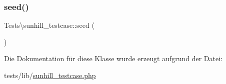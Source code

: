 \subsubsection{\texorpdfstring{seed()}{seed()}}
{\footnotesize\ttfamily Tests\textbackslash{}sunhill\+\_\+testcase\+::seed (\begin{DoxyParamCaption}{ }\end{DoxyParamCaption})\hspace{0.3cm}{\ttfamily [protected]}}



Die Dokumentation für diese Klasse wurde erzeugt aufgrund der Datei\+:\begin{DoxyCompactItemize}
\item 
tests/lib/\hyperlink{sunhill__testcase_8php}{sunhill\+\_\+testcase.\+php}\end{DoxyCompactItemize}
